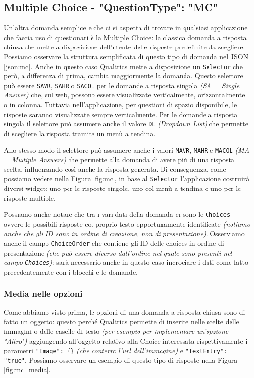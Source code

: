 \subsection{Multiple Choice - "QuestionType": "MC"}
Un'altra domanda semplice e che ci si aspetta di trovare in qualsiasi applicazione che faccia uso di questionari è la Multiple Choice: la classica domanda a risposta chiusa che mette a disposizione dell'utente delle risposte predefinite da scegliere. Possiamo osservare la struttura semplificata di questo tipo di domanda nel JSON \ref{json:mc}. Anche in questo caso Qualtrics mette a disposizione un \texttt{Selector} che però, a differenza di prima, cambia maggiormente la domanda. Questo selettore può essere \texttt{SAVR}, \texttt{SAHR} o \texttt{SACOL} per le domande a risposta singola \textit{(SA = Single Answer)} che, sul web, possono essere visualizzate verticalmente, orizzontalmente o in colonna. Tuttavia nell'applicazione, per questioni di spazio disponibile, le risposte saranno visualizzate sempre verticalmente. Per le domande a risposta singola il selettore può assumere anche il valore \texttt{DL} \textit{(Dropdown List)} che permette di scegliere la risposta tramite un menù a tendina.

Allo stesso modo il selettore può assumere anche i valori \texttt{MAVR}, \texttt{MAHR} e \texttt{MACOL} \textit{(MA = Multiple Answers)} che permette alla domanda di avere più di una risposta scelta, influenzando così anche la risposta generata. Di conseguenza, come possiamo vedere nella Figura \ref{fig:mc}, in base al \texttt{Selector} l'applicazione costruirà diversi widget: uno per le risposte singole, uno col menù a tendina o uno per le risposte multiple.

Possiamo anche notare che tra i vari dati della domanda ci sono le \texttt{Choices}, ovvero le possibili risposte col proprio testo opportunamente identificate \textit{(notiamo anche che gli ID sono in ordine di creazione, non di presentazione)}. Osserviamo anche il campo \texttt{ChoiceOrder} che contiene gli ID delle choices in ordine di presentazione \textit{(che può essere diverso dall'ordine nel quale sono presenti nel campo \texttt{Choices})}: sarà necessario anche in questo caso incrociare i dati come fatto precedentemente con i blocchi e le domande.

\subsubsection{Media nelle opzioni}
Come abbiamo visto prima, le opzioni di una domanda a risposta chiusa sono di fatto un oggetto: questo perché Qualtrics permette di inserire nelle scelte delle immagini o delle caselle di testo \textit{(per esempio per implementare un'opzione "Altro")} aggiungendo all'oggetto relativo alla Choice interessata rispettivamente i parametri \texttt{"Image": \{\}} \textit{(che conterrà l'url dell'immagine)} e \texttt{"TextEntry": "true"}.
Possiamo osservare un esempio di questo tipo di risposte nella Figura \ref{fig:mc_media}.


